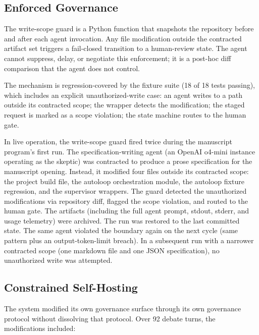 \documentclass[11pt]{article}
\begin{document}
\subsection{Enforced Governance}

The write-scope guard is a Python function that snapshots the repository before and after each agent invocation. Any file modification outside the contracted artifact set triggers a fail-closed transition to a human-review state. The agent cannot suppress, delay, or negotiate this enforcement; it is a post-hoc diff comparison that the agent does not control.

The mechanism is regression-covered by the fixture suite (18 of 18 tests passing), which includes an explicit unauthorized-write case: an agent writes to a path outside its contracted scope; the wrapper detects the modification; the staged request is marked as a scope violation; the state machine routes to the human gate.

In live operation, the write-scope guard fired twice during the manuscript program's first run. The specification-writing agent (an OpenAI o4-mini instance operating as the skeptic) was contracted to produce a prose specification for the manuscript opening. Instead, it modified four files outside its contracted scope: the project build file, the autoloop orchestration module, the autoloop fixture regression, and the supervisor wrappers. The guard detected the unauthorized modifications via repository diff, flagged the scope violation, and routed to the human gate. The artifacts (including the full agent prompt, stdout, stderr, and usage telemetry) were archived. The run was restored to the last committed state. The same agent violated the boundary again on the next cycle (same pattern plus an output-token-limit breach). In a subsequent run with a narrower contracted scope (one markdown file and one JSON specification), no unauthorized write was attempted.

\subsection{Constrained Self-Hosting}

The system modified its own governance surface through its own governance protocol without dissolving that protocol. Over 92 debate turns, the modifications included:
\end{document}
